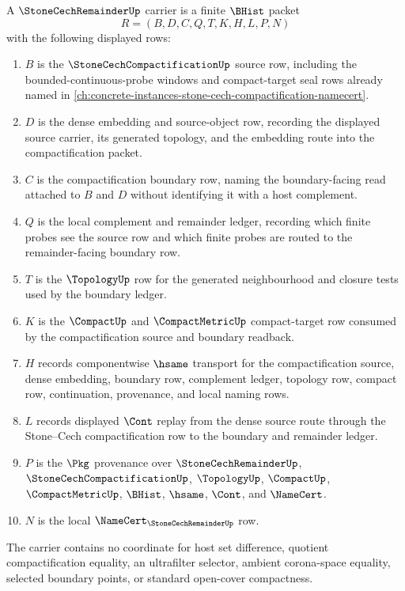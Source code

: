 \begin{definition}
\label{def:stone-cech-remainder-carrier}
A $\StoneCechRemainderUp$ carrier is a finite $\BHist$ packet
$$
R=(B,D,C,Q,T,K,H,L,P,N)
$$
with the following displayed rows:
\begin{enumerate}
\item $B$ is the $\StoneCechCompactificationUp$ source row, including the bounded-continuous-probe windows and compact-target seal rows already named in \autoref{ch:concrete-instances-stone-cech-compactification-namecert}.
\item $D$ is the dense embedding and source-object row, recording the displayed source carrier, its generated topology, and the embedding route into the compactification packet.
\item $C$ is the compactification boundary row, naming the boundary-facing read attached to $B$ and $D$ without identifying it with a host complement.
\item $Q$ is the local complement and remainder ledger, recording which finite probes see the source row and which finite probes are routed to the remainder-facing boundary row.
\item $T$ is the $\TopologyUp$ row for the generated neighbourhood and closure tests used by the boundary ledger.
\item $K$ is the $\CompactUp$ and $\CompactMetricUp$ compact-target row consumed by the compactification source and boundary readback.
\item $H$ records componentwise $\hsame$ transport for the compactification source, dense embedding, boundary row, complement ledger, topology row, compact row, continuation, provenance, and local naming rows.
\item $L$ records displayed $\Cont$ replay from the dense source route through the Stone--Cech compactification row to the boundary and remainder ledger.
\item $P$ is the $\Pkg$ provenance over $\StoneCechRemainderUp$, $\StoneCechCompactificationUp$, $\TopologyUp$, $\CompactUp$, $\CompactMetricUp$, $\BHist$, $\hsame$, $\Cont$, and $\NameCert$.
\item $N$ is the local $\NameCert_{\StoneCechRemainderUp}$ row.
\end{enumerate}
The carrier contains no coordinate for host set difference, quotient compactification equality, an ultrafilter selector, ambient corona-space equality, selected boundary points, or standard open-cover compactness.
\end{definition}

